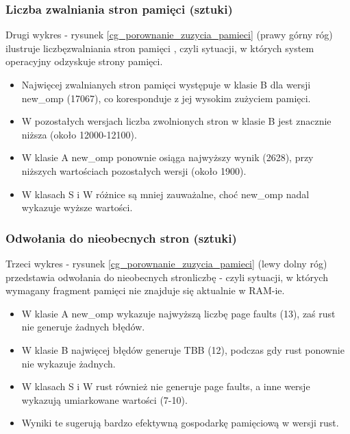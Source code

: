 \subsubsection{Liczba zwalniania stron pamięci (sztuki)}
Drugi wykres - rysunek \ref{cg_porownanie_zuzycia_pamieci} (prawy górny róg) ilustruje liczbęzwalniania stron pamięci , czyli sytuacji, w których system operacyjny odzyskuje strony pamięci.
\begin{itemize}
    \item Najwięcej zwalnianych stron pamięci występuje w klasie B dla wersji new\_omp (17067), co koresponduje z jej wysokim zużyciem pamięci.
    \item W pozostałych wersjach liczba zwolnionych stron w klasie B jest znacznie niższa (około 12000-12100).
    \item W klasie A new\_omp ponownie osiąga najwyższy wynik (2628), przy niższych wartościach pozostałych wersji (około 1900).
    \item W klasach S i W różnice są mniej zauważalne, choć new\_omp nadal wykazuje wyższe wartości.
\end{itemize}

\subsubsection{Odwołania do nieobecnych stron (sztuki)}
Trzeci wykres - rysunek \ref{cg_porownanie_zuzycia_pamieci} (lewy dolny róg) przedstawia odwołania do nieobecnych stronliczbę  - czyli sytuacji, w których wymagany fragment pamięci nie znajduje się aktualnie w RAM-ie.
\begin{itemize}
    \item W klasie A new\_omp wykazuje najwyższą liczbę page faults (13), zaś rust nie generuje żadnych błędów.
    \item W klasie B najwięcej błędów generuje TBB (12), podczas gdy rust ponownie nie wykazuje żadnych.
    \item W klasach S i W rust również nie generuje page faults, a inne wersje wykazują umiarkowane wartości (7-10).
    \item Wyniki te sugerują bardzo efektywną gospodarkę pamięciową w wersji rust.
\end{itemize}


